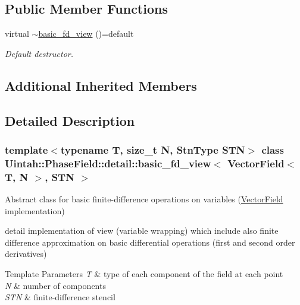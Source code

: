 \subsection*{Public Member Functions}
\begin{DoxyCompactItemize}
\item 
virtual \hyperlink{classUintah_1_1PhaseField_1_1detail_1_1basic__fd__view_3_01VectorField_3_01T_00_01N_01_4_00_01STN_01_4_ac602ec10bc7689756306f5a8a89ba8ee}{$\sim$basic\+\_\+fd\+\_\+view} ()=default
\begin{DoxyCompactList}\small\item\em Default destructor. \end{DoxyCompactList}\end{DoxyCompactItemize}
\subsection*{Additional Inherited Members}


\subsection{Detailed Description}
\subsubsection*{template$<$typename T, size\+\_\+t N, Stn\+Type S\+TN$>$\newline
class Uintah\+::\+Phase\+Field\+::detail\+::basic\+\_\+fd\+\_\+view$<$ Vector\+Field$<$ T, N $>$, S\+T\+N $>$}

Abstract class for basic finite-\/difference operations on variables (\hyperlink{structUintah_1_1PhaseField_1_1VectorField}{Vector\+Field} implementation) 

detail implementation of view (variable wrapping) which include also finite difference approximation on basic differential operations (first and second order derivatives)


\begin{DoxyTemplParams}{Template Parameters}
{\em T} & type of each component of the field at each point \\
\hline
{\em N} & number of components \\
\hline
{\em S\+TN} & finite-\/difference stencil \\
\hline
\end{DoxyTemplParams}


